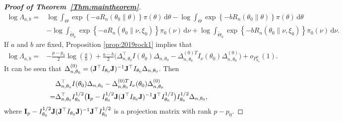 \documentclass[11pt]{article}
\theoremstyle{plain}
\theoremstyle{definition}
\theoremstyle{remark}
\begin{document}
    \begin{proof}[\textbf{Proof of Theorem~\ref{Thm:maintheorem}}]
$$
\begin{aligned}
\log \Lambda_{a,b}
    =&
    \log\int_{\Theta}
    \exp\left\{-a R_n(\theta_0\| \theta) \right\} \pi(\theta)
\, \mathrm d \theta
-
    \log\int_{\Theta}
    \exp\left\{-b R_n(\theta_0\| \theta) \right\} \pi(\theta)
\, \mathrm d \theta
    \\
    &
    -\log\int_{\tilde \Theta_0}
    \exp\left\{-a R_n(\theta_0\| \nu, \xi_0) \right\} \pi_0(\nu)
\, \mathrm d \nu
+\log\int_{\tilde \Theta_0}
    \exp\left\{-b R_n(\theta_0\| \nu, \xi_0) \right\} \pi_0(\nu)
\, \mathrm d \nu
.
\end{aligned}
$$
If $a$ and $b$ are fixed, Proposition \ref{prop:2019rock1} implies that
        \begin{align*}
\log \Lambda_{a,b}
    =&
    -\frac{p-p_0}{2}\log \left(\frac{a}{b}\right)
    +
    \frac{a-b}{2}\Big(
        \Delta_{n,\theta_0}^\top  I(\theta_0) \Delta_{n,\theta_0}
    -
    \Delta_{n,\theta_0}^{{(0)}T} I_{\nu}(\theta_0) \Delta^{(0)}_{n,\theta_0}
    \Big)
    +o_{P^n_{\theta_n}}(1).
        \end{align*}
It can be seen that $\Delta_{n,\theta_0}^{(0)}=(\mathbf{J}^\top  I_{\theta_0}\mathbf{J})^{-1} \mathbf{J}^\top  I_{\theta_0} \Delta_{n,\theta_0}$.
Then
\begin{equation*}
    \begin{split}
        &
        \Delta_{n,\theta_0}^\top  I(\theta_0) \Delta_{n,\theta_0}
    -
    \Delta_{n,\theta_0}^{{(0)}T} I_{\nu}(\theta_0) \Delta^{(0)}_{n,\theta_0}
            \\
            =&
            \Delta_{n,\theta_0}^\top  I_{\theta_0}^{1/2}\big(
            \mathbf{I}_p-
            I_{\theta_0}^{1/2} \mathbf{J} (\mathbf{J}^\top  I_{\theta_0} \mathbf{J})^{-1} \mathbf{J}^\top  I_{\theta_0}^{1/2}
            \big)I_{\theta_0}^{1/2}\Delta_{n,\theta_0},
    \end{split}
\end{equation*}
where $
            \mathbf{I}_p-
            I_{\theta_0}^{1/2} \mathbf{J} (\mathbf{J}^\top  I_{\theta_0} \mathbf{J})^{-1} \mathbf{J}^\top  I_{\theta_0}^{1/2}
$
is a projection matrix with rank $p-p_0$.


\end{proof}
\end{document}
